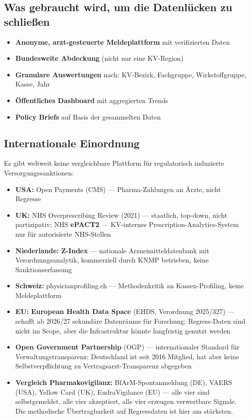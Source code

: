 \documentclass{umbruch-position}
\begin{document}
\subsection{Was gebraucht wird, um die Datenlücken zu schließen}

\begin{itemize}[nosep]
  \item \textbf{Anonyme, arzt-gesteuerte Meldeplattform} mit verifizierten Daten
  \item \textbf{Bundesweite Abdeckung} (nicht nur eine KV-Region)
  \item \textbf{Granulare Auswertungen} nach: KV-Bezirk, Fachgruppe, Wirkstoffgruppe, Kasse, Jahr
  \item \textbf{Öffentliches Dashboard} mit aggregierten Trends
  \item \textbf{Policy Briefs} auf Basis der gesammelten Daten
\end{itemize}

\subsection{Internationale Einordnung}

Es gibt weltweit keine vergleichbare Plattform für regulatorisch induzierte Versorgungssanktionen:
\begin{itemize}[nosep]
  \item \textbf{USA:} Open Payments (CMS) --- Pharma-Zahlungen an Ärzte, nicht Regresse
  \item \textbf{UK:} NHS Overprescribing Review (2021) --- staatlich, top-down, nicht partizipativ; NHS \textbf{ePACT2} --- KV-internes Prescription-Analytics-System nur für autorisierte NHS-Stellen
  \item \textbf{Niederlande:} \textbf{Z-Index} --- nationale Arzneimitteldatenbank mit Verordnungsanalytik, kommerziell durch KNMP betrieben, keine Sanktionserfassung
  \item \textbf{Schweiz:} physicianprofiling.ch --- Methodenkritik an Kassen-Profiling, keine Meldeplattform
  \item \textbf{EU:} \textbf{European Health Data Space} (EHDS, Verordnung 2025/327) --- schafft ab 2026/27 sekundäre Datenräume für Forschung; Regress-Daten sind nicht im Scope, aber die Infrastruktur könnte langfristig genutzt werden
  \item \textbf{Open Government Partnership} (OGP) --- internationaler Standard für Verwaltungstransparenz; Deutschland ist seit 2016 Mitglied, hat aber keine Selbstverpflichtung zu Vertragsarzt-Transparenz abgegeben
  \item \textbf{Vergleich Pharmakovigilanz:} BfArM-Spontanmeldung (DE), VAERS (USA), Yellow Card (UK), EudraVigilance (EU) --- alle vier sind selbstgemeldet, alle vier akzeptiert, alle vier erzeugen verwertbare Signale. Die methodische Übertragbarkeit auf Regressdaten ist hier am stärksten.
\end{itemize}
\end{document}
